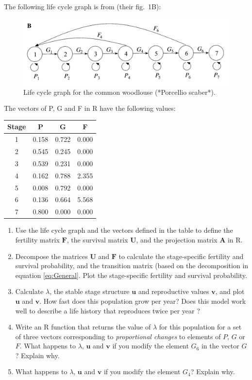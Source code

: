 \documentclass[
]{book}
\begin{document}
The following life cycle graph is from \citet{Kammenga1} (their fig.~1B):

\begin{figure}
\includegraphics[width=0.8\linewidth]{Porcellio_scaber2} \caption{Life cycle graph for the common woodlouse (*Porcellio scaber*).}\label{fig:Porcellio2}
\end{figure}

The vectors of P, G and F in R have the following values:

\begin{tabular}{c|c|c|c}
\hline
Stage & P & G & F\\
\hline
1 & 0.158 & 0.722 & 0.000\\
\hline
2 & 0.545 & 0.245 & 0.000\\
\hline
3 & 0.539 & 0.231 & 0.000\\
\hline
4 & 0.162 & 0.788 & 2.355\\
\hline
5 & 0.008 & 0.792 & 0.000\\
\hline
6 & 0.136 & 0.664 & 5.568\\
\hline
7 & 0.800 & 0.000 & 0.000\\
\hline
\end{tabular}

\begin{enumerate}
\def\labelenumi{\arabic{enumi}.}
\item
  Use the life cycle graph and the vectors defined in the table to define the fertility matrix \(\mathbf{F}\), the survival matrix \(\mathbf{U}\), and the projection matrix \(\mathbf{A}\) in R.
\item
  Decompose the matrices \(\mathbf{U}\) and \(\mathbf{F}\) to calculate the stage-specific fertility and survival probability, and the transition matrix (based on the decomposition in equation \eqref{eq:General}. Plot the stage-specific fertility and survival probability.
\item
  Calculate \(\lambda\), the stable stage structure \(\mathbf{u}\) and reproductive values \(\mathbf{v}\), and plot \(\mathbf{u}\) and \(\mathbf{v}\). How fast does this population grow per year? Does this model work well to describe a life history that reproduces twice per year \citep{Kammenga1}?
\item
  Write an R function that returns the value of \(\lambda\) for this population for a set of three vectors corresponding to \emph{proportional changes} to elements of \(P\), \(G\) or \(F\). What happens to \(\lambda\), \(\mathbf{u}\) and \(\mathbf{v}\) if you modify the element \(G_6\) in the vector \(G\)? Explain why.
\item
  What happens to \(\lambda\), \(\mathbf{u}\) and \(\mathbf{v}\) if you modify the element \(G_4\)? Explain why.
\end{enumerate}
\end{document}
